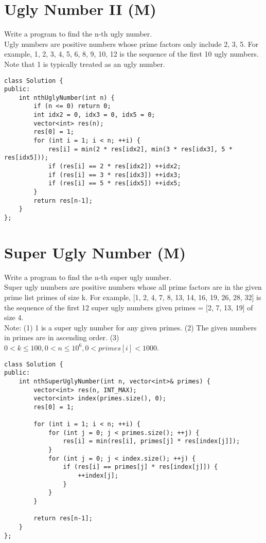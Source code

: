 \section{Ugly Number II (M)}
Write a program to find the n-th ugly number. \\

Ugly numbers are positive numbers whose prime factors only include 2, 3, 5. For example, 1, 2, 3, 4, 5, 6, 8, 9, 10, 12 is the sequence of the first 10 ugly numbers. \\

Note that 1 is typically treated as an ugly number. \\

\begin{lstlisting}
class Solution {
public:
    int nthUglyNumber(int n) {
        if (n <= 0) return 0;
        int idx2 = 0, idx3 = 0, idx5 = 0;
        vector<int> res(n);
        res[0] = 1;
        for (int i = 1; i < n; ++i) {
            res[i] = min(2 * res[idx2], min(3 * res[idx3], 5 * res[idx5]));
            if (res[i] == 2 * res[idx2]) ++idx2;
            if (res[i] == 3 * res[idx3]) ++idx3;
            if (res[i] == 5 * res[idx5]) ++idx5;
        }
        return res[n-1];
    }
};
\end{lstlisting}


\section{Super Ugly Number (M)}
Write a program to find the n-th super ugly number.\\

Super ugly numbers are positive numbers whose all prime factors are in the given prime list primes of size k. For example, [1, 2, 4, 7, 8, 13, 14, 16, 19, 26, 28, 32] is the sequence of the first 12 super ugly numbers given primes = [2, 7, 13, 19] of size 4.\\

Note:
(1) 1 is a super ugly number for any given primes.
(2) The given numbers in primes are in ascending order.
(3) $0 < k \leq 100, 0 < n \leq 10^6, 0 < primes[i] < 1000$. \\

\begin{lstlisting}
class Solution {
public:
    int nthSuperUglyNumber(int n, vector<int>& primes) {
        vector<int> res(n, INT_MAX);
        vector<int> index(primes.size(), 0);
        res[0] = 1;
        
        for (int i = 1; i < n; ++i) {
            for (int j = 0; j < primes.size(); ++j) {
                res[i] = min(res[i], primes[j] * res[index[j]]);
            }
            for (int j = 0; j < index.size(); ++j) {
                if (res[i] == primes[j] * res[index[j]]) {
                    ++index[j];
                }
            }
        }
        
        return res[n-1];
    }
};
\end{lstlisting}


